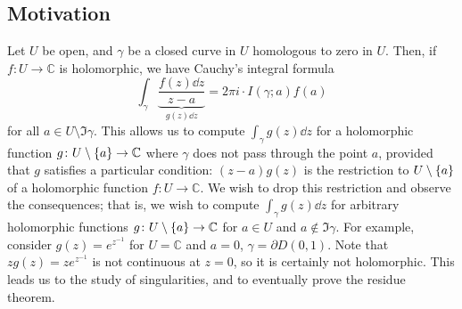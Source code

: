 \subsection{Motivation}
Let \( U \) be open, and \( \gamma \) be a closed curve in \( U \) homologous to zero in \( U \).
Then, if \( f \colon U \to \mathbb C \) is holomorphic, we have Cauchy's integral formula
\[
	\int_\gamma \underbrace{\frac{f(z) \dd{z}}{z-a}}_{g(z) \dd{z}} = 2 \pi i \cdot I(\gamma;a) f(a)
\]
for all \( a \in U \setminus \Im \gamma \).
This allows us to compute \( \int_\gamma g(z) \dd{z} \) for a holomorphic function \( g \colon U \setminus \qty{a} \to \mathbb C \) where \( \gamma \) does not pass through the point \( a \), provided that \( g \) satisfies a particular condition: \( (z-a) g(z) \) is the restriction to \( U \setminus \qty{a} \) of a holomorphic function \( f \colon U \to \mathbb C \).
We wish to drop this restriction and observe the consequences; that is, we wish to compute \( \int_\gamma g(z) \dd{z} \) for arbitrary holomorphic functions \( g \colon U \setminus \qty{a} \to \mathbb C \) for \( a \in U \) and \( a \not\in \Im \gamma \).
For example, consider \( g(z) = e^{z^{-1}} \) for \( U = \mathbb C \) and \( a = 0 \), \( \gamma = \partial D(0,1) \).
Note that \( zg(z) = ze^{z^{-1}} \) is not continuous at \( z = 0 \), so it is certainly not holomorphic.
This leads us to the study of singularities, and to eventually prove the residue theorem.

